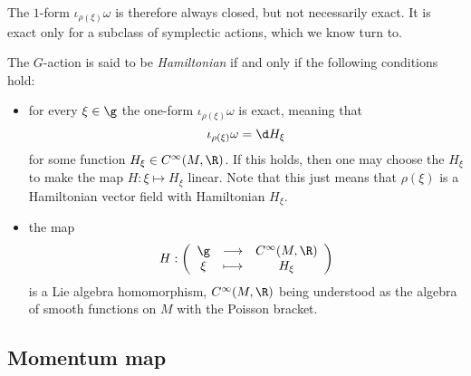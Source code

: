 \documentclass{worksheetclass}
\begin{document}
        The $1$-form $\iota_{\rho(\xi)}\omega$ is therefore always closed, but not necessarily exact. It is exact only for a subclass of symplectic actions, which we know turn to.

        \begin{defn}
            The $G$-action is said to be \emph{Hamiltonian} if and only if the following conditions hold:
            \begin{itemize}
                \item for every $\xi\in\g$ the one-form $\iota_{\rho(\xi)}\omega$ is exact, meaning that
                \begin{equation}
                    \iota_{\rho(\xi)}\omega=\d H_{\xi}
                \end{equation}
                for some function $H_{\xi}\in C^\infty(M,\R)$. If this holds, then one may choose the $H_\xi$ to make the map $H:\xi\mapsto H_\xi$ linear. Note that this just means that $\rho(\xi)$ is a Hamiltonian vector field with Hamiltonian $H_\xi$.
                \item the map
                \begin{equation}
                    H:\left(
                    \begin{array}{ccc}
                            \g & \longrightarrow & C^\infty(M,\R) \\
                            \xi & \longmapsto & H_\xi
                    \end{array}
                    \right)
                \end{equation}
                is a Lie algebra homomorphism, $C^\infty(M,\R)$ being understood as the algebra of smooth functions on $M$ with the Poisson bracket.
            \end{itemize}
        \end{defn}

    \subsection{Momentum map}
        
\end{document}
